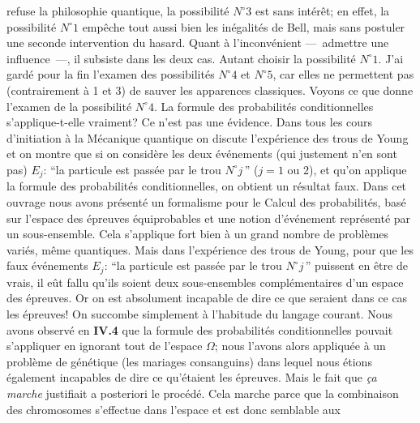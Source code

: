 refuse la philosophie quantique,  la possibilit\'e $N^\circ 3$ est
sans int\'er\^et;  en effet,  la possibilit\'e $N^\circ 1$ emp\^eche
tout aussi bien les in\'egalit\'es de Bell,  mais sans postuler une
seconde intervention du hasard.  Quant \`a l'inconv\'enient
---~admettre une influence~---,  il subsiste dans les deux cas. 
Autant choisir la possibilit\'e $N^\circ 1$. 
\medskip
J'ai gard\'e pour la fin l'examen des possibilit\'es $N^\circ 4$ et
$N^\circ 5$,  car elles ne permettent pas (contrairement \`a 1 et 3)
de sauver les apparences classiques. 
\medskip
Voyons ce que donne l'examen de la possibilit\'e $N^\circ 4$.  La formule des
probabilit\'es conditionnelles s'applique-t-elle vraiment?  Ce n'est pas
une \'evidence.  Dans tous les cours d'initiation \`a la M\'ecanique
quantique on discute l'exp\'erience des trous de Young et on montre que si on 
consid\`ere les deux \'ev\'enements (qui justement n'en sont pas) $E_j$: 
``la particule  est pass\'ee par le trou $N^\circ j\,$'' ($j=1$ ou $2$), et 
qu'on applique la formule des probabilit\'es conditionnelles, on obtient 
un r\'esultat faux.   
\medskip 
Dans cet ouvrage nous avons pr\'esent\'e un formalisme pour le Calcul  
des probabilit\'es, bas\'e sur l'espace des \'epreuves \'equiprobables 
et une notion d'\'ev\'enement repr\'esent\'e par un sous-ensemble. Cela 
s'applique fort bien \`a un grand nombre de probl\`emes vari\'es, m\^eme 
quantiques. Mais  dans l'exp\'erience des trous de Young, pour que les  
faux \'ev\'enements $E_j$: ``la particule est pass\'ee par le trou $N^\circ 
j\,$'' puissent en \^etre de vrais, il e\^ut fallu qu'ils soient deux  
sous-ensembles compl\'ementaires d'un espace des \'epreuves. Or on est 
absolument  incapable de dire ce que seraient dans ce cas les \'epreuves! 
On succombe simplement \`a l'habitude du langage courant. Nous avons 
observ\'e en {\bf IV.4} que la formule des probabilit\'es conditionnelles 
pouvait s'appliquer en ignorant tout de l'espace $\Omega$; nous l'avons 
alors appliqu\'ee \`a un probl\`eme de g\'en\'etique (les mariages  
consanguins) dans lequel nous \'etions \'egalement incapables de dire ce 
qu'\'etaient les \'epreuves. Mais le fait que {\it \c{c}a marche} justifiait  
a posteriori le proc\'ed\'e. Cela marche parce que la combinaison des 
chromosomes s'effectue dans l'espace et est donc semblable aux 
